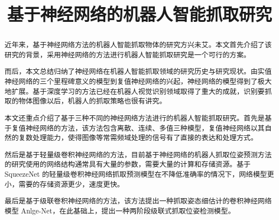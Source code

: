 \documentclass[no-math, withoutpreface]{YangThesis}
\title{基于神经网络的机器人智能抓取研究}
\begin{document}
\maketitle

\setcounter{page}{1}
 
\begin{abstract}
 
近年来，基于神经网络方法的机器人智能抓取物体的研究方兴未艾。本文首先介绍了该研究的背景，采用神经网络的方法进行机器人智能抓取研究是一个可行的方案。

而后，本文总结归纳了神经网络在机器人智能抓取领域的研究历史与研究现状。由实值神经网络的三个里程碑意义的模型到复值神经网络的兴起，神经网络的模型得到了极大地扩展。基于深度学习的方法已经在机器人视觉识别领域取得了重大的成就，识别要抓取的物体图像以后，机器人的抓取策略也很有讲究。

本文还重点介绍了基于三种不同的神经网络方法进行的机器人智能抓取研究。首先是基于复值神经网络的方法，该方法包含离散、连续、多值三种模型，复值神经网络以其自然的复数处理能力，使得图像等常需频域处理的信号有了直接的表达和处理方式。

然后是基于轻量级卷积神经网络的方法，目前基于神经网络的机器人抓取位姿预测方法的研究使用的网络结构通常具有大量的参数，需要大量的计算和存储资源。基于 SqueezeNet 的轻量级卷积神经网络抓取预测模型在不降低准确率的情况下，网络模型更小，需要的存储资源更少，速度更快。

最后是基于级联卷积神经网络的方法，该方法提出一种抓取姿态细估计的卷积神经网络模型 Anlge-Net，在此基础上，提出一种两阶段级联式抓取位姿检测模型。

\end{abstract}
\end{document}

